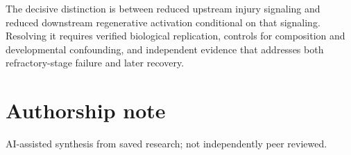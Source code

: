\documentclass[11pt]{article}
\begin{document}
The decisive distinction is between reduced upstream injury signaling and reduced downstream regenerative activation conditional on that signaling. Resolving it requires verified biological replication, controls for composition and developmental confounding, and independent evidence that addresses both refractory-stage failure and later recovery.

\section*{Authorship note}
AI-assisted synthesis from saved research; not independently peer reviewed.
\end{document}
